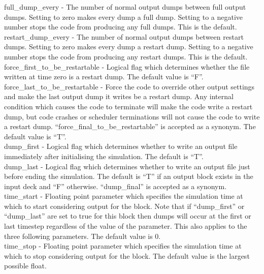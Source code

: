 {\emphtext full\_dump\_every} - The number of normal output dumps between full
output dumps. Setting to zero makes every dump a full dump. Setting to a
negative number stops the code from producing any full dumps. This is the
default.\\

{\emphtext restart\_dump\_every} - The number of normal output dumps between
restart dumps. Setting to zero makes every dump a restart dump. Setting to a
negative number stops the code from producing any restart dumps. This is the
default.\\

{\emphtext force\_first\_to\_be\_restartable} - Logical flag which determines
  whether the file written at time zero is a restart dump. The default value
  is ``F''.\\

{\emphtext force\_last\_to\_be\_restartable} - Force the code to override
other output settings and make the last output dump it writes be a restart
dump. Any internal condition which causes the code to terminate will make the
code write a restart dump, but code crashes or scheduler terminations will not
cause the code to write a restart dump.
``force\_final\_to\_be\_restartable'' is accepted as a synonym.
The default value is ``T''.\\

{\emphtext dump\_first} - Logical flag which determines whether to write an
  output file immediately after initialising the simulation. The default is
  ``T''.\\

{\emphtext dump\_last} - Logical flag which determines whether to write an
  output file just before ending the simulation. The default is ``T'' if
  an output block exists in the input deck and ``F'' otherwise.
  ``dump\_final'' is accepted as a synonym.\\

{\emphtext time\_start} - Floating point parameter which specifies the
  simulation time at which to start considering output for the block. Note
  that if ``dump\_first'' or ``dump\_last'' are set to true for this block then
  dumps will occur at the first or last timestep regardless of the value of
  the 
  parameter. This also applies to the three following parameters.
  The default value is 0.\\

{\emphtext time\_stop} - Floating point parameter which specifies the
  simulation time at which to stop considering output for the block.
  The default value is the largest possible float.\\

